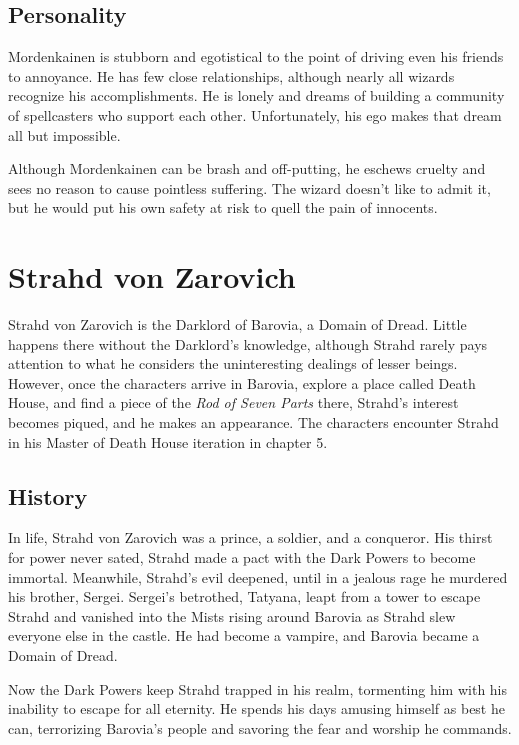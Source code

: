 \documentclass[10pt,a4paper,twoside,bg=print,twocolumn,openany,nodeprecatedcode]{dndbook}
\begin{document}
\subsection{Personality}
Mordenkainen is stubborn and egotistical to the point of driving even his friends to annoyance. He has few close relationships, although nearly all wizards recognize his accomplishments. He is lonely and dreams of building a community of spellcasters who support each other. Unfortunately, his ego makes that dream all but impossible.

Although Mordenkainen can be brash and off-putting, he eschews cruelty and sees no reason to cause pointless suffering. The wizard doesn't like to admit it, but he would put his own safety at risk to quell the pain of innocents.

\section{Strahd von Zarovich}
Strahd von Zarovich is the Darklord of Barovia, a Domain of Dread. Little happens there without the Darklord's knowledge, although Strahd rarely pays attention to what he considers the uninteresting dealings of lesser beings. However, once the characters arrive in Barovia, explore a place called Death House, and find a piece of the \textit{Rod of Seven Parts} there, Strahd's interest becomes piqued, and he makes an appearance. The characters encounter Strahd in his Master of Death House iteration in chapter 5.

\subsection{History}
In life, Strahd von Zarovich was a prince, a soldier, and a conqueror. His thirst for power never sated, Strahd made a pact with the Dark Powers to become immortal. Meanwhile, Strahd's evil deepened, until in a jealous rage he murdered his brother, Sergei. Sergei's betrothed, Tatyana, leapt from a tower to escape Strahd and vanished into the Mists rising around Barovia as Strahd slew everyone else in the castle. He had become a vampire, and Barovia became a Domain of Dread.

Now the Dark Powers keep Strahd trapped in his realm, tormenting him with his inability to escape for all eternity. He spends his days amusing himself as best he can, terrorizing Barovia's people and savoring the fear and worship he commands.
\end{document}
